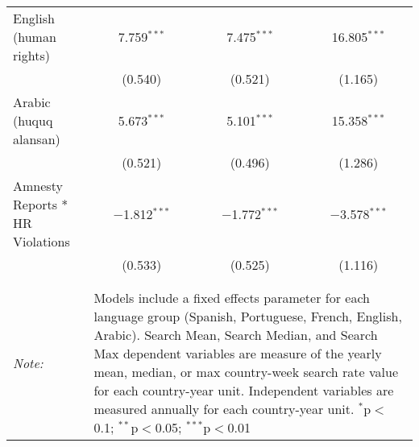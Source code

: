 \begin{table}[!htbp]
\begin{tabular}{@{\extracolsep{5pt}}lccc}
  English (human rights) & 7.759$^{***}$ & 7.475$^{***}$ & 16.805$^{***}$ \\ 
  & (0.540) & (0.521) & (1.165) \\ 
  Arabic (huquq alansan) & 5.673$^{***}$ & 5.101$^{***}$ & 15.358$^{***}$ \\ 
  & (0.521) & (0.496) & (1.286) \\ 
  Amnesty Reports * HR Violations & $-$1.812$^{***}$ & $-$1.772$^{***}$ & $-$3.578$^{***}$ \\ 
  & (0.533) & (0.525) & (1.116) \\ 
 \hline \\[-1.8ex] 
\hline 
\hline \\[-1.8ex] 
\textit{Note:}  & \multicolumn{3}{l}{\parbox[t]{8cm}{Models include a fixed effects parameter for each language group (Spanish, Portuguese, French, English, Arabic). Search Mean, Search Median, and Search Max dependent variables are measure of the yearly mean, median, or max country-week search rate value for each country-year unit. Independent variables are measured annually for each country-year unit. $^{*}$p$<$0.1; $^{**}$p$<$0.05; $^{***}$p$<$0.01}} \\ 
\end{tabular} 
\end{table} 
